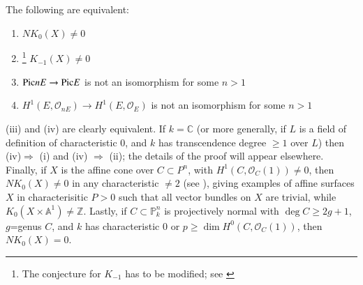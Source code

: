 \begin{con}
The following are equivalent: 
\begin{enumerate}
\renewcommand{\theenumi}{\roman{enumi}}
\renewcommand{\labelenumi}{(\theenumi)}
\item $NK_0(X)\neq 0$
\item\footnote{The conjecture for $K_{-1}$ has to be modified; see \cite{Srinivasd}} $K_{-1}(X)\neq 0$ 
\item $\mathrm{Pic} nE\to \mathrm{Pic} E$ is not an isomorphism for some $n>1$ 
\item $H^{1}(E, \mathscr{O}_{n E})\to H^{1}(E, \mathscr{O}_{E})$ is not an isomorphism for some $n>1$ 
\end{enumerate}

(iii) and (iv) are clearly equivalent. If $k=\mathbb{C}$ (or more generally, if $L$ is a field of definition of characteristic $0$, and $k$ has transcendence degree $\geq 1$ over $L$) then (iv)$\Rightarrow$ (i) and (iv) $\Rightarrow$ (ii); the details of the proof will appear elsewhere. Finally, if $X$ is the affine cone over $C\subset P^{n}$, with $H^{1}(C, \mathscr{O}_C(1))\neq 0$, then $NK_0(X)\neq 0$ in any characteristic $\neq 2$ (see \cite{Coombes}), giving examples of affine surfaces $X$ in characterisitic $P>0$ such that all vector bundles on $X$ are trivial, while $K_0(X\times \mathbb{A}^{1})\neq\mathbb{Z}$. Lastly, if $C\subset \mathbb{P}^{n}_k$ is projectively normal with $\deg C\geq 2g+1$, $g$=genus $C$, and $k$ has characteristic $0$ or $p\geq \dim H^{0}(C, \mathscr{O}_C(1))$, then $NK_0(X)=0$. 
\end{con}


